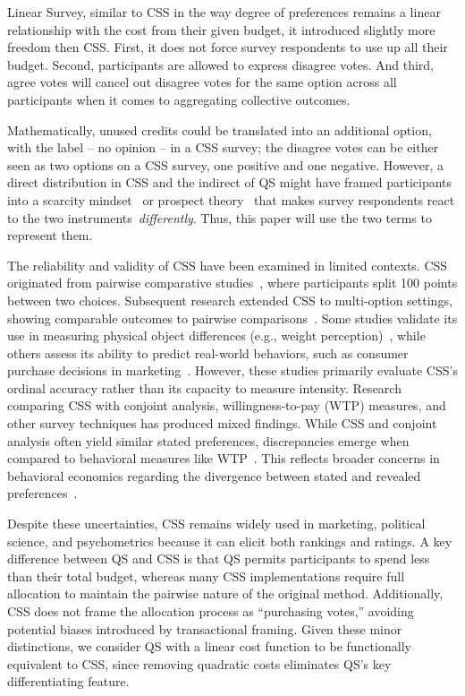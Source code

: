 Linear Survey, similar to CSS in the way degree of preferences remains a linear relationship with the cost from their given budget, it introduced slightly more freedom then CSS. First, it does not force survey respondents to use up all their budget. Second, participants are allowed to express disagree votes. And third, agree votes will cancel out disagree votes for the same option across all participants when it comes to aggregating collective outcomes.

Mathematically, unused credits could be translated into an additional option, with the label -- no opinion -- in a CSS survey; the disagree votes can be either seen as two options on a CSS survey, one positive and one negative. However, a direct distribution in CSS and the indirect of QS might have framed participants into a scarcity mindset~\cite{shahScarcityFramesValue2015} or prospect theory~\cite{kahnemanProspectTheoryAnalysis1979} that makes survey respondents react to the two instruments~\textit{differently}. Thus, this paper will use the two terms to represent them.

The reliability and validity of CSS have been examined in limited contexts. CSS originated from pairwise comparative studies~\cite{metfesselProposalQuantitativeReporting1947}, where participants split 100 points between two choices. Subsequent research extended CSS to multi-option settings, showing comparable outcomes to pairwise comparisons~\cite{collewetPreferenceEstimationPoint2023}.  Some studies validate its use in measuring physical object differences (e.g., weight perception)~\cite{dudekValidityPointAssignmentProcedure1957}, while others assess its ability to predict real-world behaviors, such as consumer purchase decisions in marketing~\cite{collewetPreferenceEstimationPoint2023}. However, these studies primarily evaluate CSS’s ordinal accuracy rather than its capacity to measure intensity. Research comparing CSS with conjoint analysis, willingness-to-pay (WTP) measures, and other survey techniques has produced mixed findings. While CSS and conjoint analysis often yield similar stated preferences, discrepancies emerge when compared to behavioral measures like WTP~\cite{louviereComparisonImportanceWeights2008}. This reflects broader concerns in behavioral economics regarding the divergence between stated and revealed preferences~\cite{collewetPreferenceEstimationPoint2023, louviereComparisonImportanceWeights2008}.

Despite these uncertainties, CSS remains widely used in marketing, political science, and psychometrics because it can elicit both rankings and ratings. A key difference between QS and CSS is that QS permits participants to spend less than their total budget, whereas many CSS implementations require full allocation to maintain the pairwise nature of the original method. Additionally, CSS does not frame the allocation process as ``purchasing votes,'' avoiding potential biases introduced by transactional framing. Given these minor distinctions, we consider QS with a linear cost function to be functionally equivalent to CSS, since removing quadratic costs eliminates QS's key differentiating feature.
